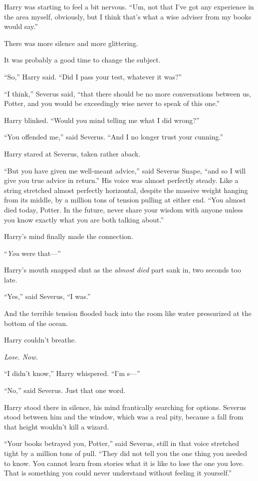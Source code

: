 Harry was starting to feel a bit nervous. “Um, not that I’ve got any experience in the area myself, obviously, but I think that’s what a wise adviser from my books would say.”

There was more silence and more glittering.

It was probably a good time to change the subject.

“So,” Harry said. “Did I pass your test, whatever it was?”

“I think,” Severus said, “that there should be no more conversations between us, Potter, and you would be exceedingly wise never to speak of this one.”

Harry blinked. “Would you mind telling me what I did wrong?”

“You offended me,” said Severus. “And I no longer trust your cunning.”

Harry stared at Severus, taken rather aback.

“But you have given me well-meant advice,” said Severus Snape, “and so I will give you true advice in return.” His voice was almost perfectly steady. Like a string stretched almost perfectly horizontal, despite the massive weight hanging from its middle, by a million tons of tension pulling at either end. “You almost died today, Potter. In the future, never share your wisdom with anyone unless you know exactly what you are both talking about.”

Harry’s mind finally made the connection.

“\emph{You} were that—”

Harry’s mouth snapped shut as the \emph{almost died} part sank in, two seconds too late.

“Yes,” said Severus, “I was.”

And the terrible tension flooded back into the room like water pressurized at the bottom of the ocean.

Harry couldn’t breathe.

\emph{Lose. Now.}

“I didn’t know,” Harry whispered. “I’m s—”

“No,” said Severus. Just that one word.

Harry stood there in silence, his mind frantically searching for options. Severus stood between him and the window, which was a real pity, because a fall from that height wouldn’t kill a wizard.

“Your books betrayed you, Potter,” said Severus, still in that voice stretched tight by a million tons of pull. “They did not tell you the one thing you needed to know. You cannot learn from stories what it is like to lose the one you love. That is something you could never understand without feeling it yourself.”

